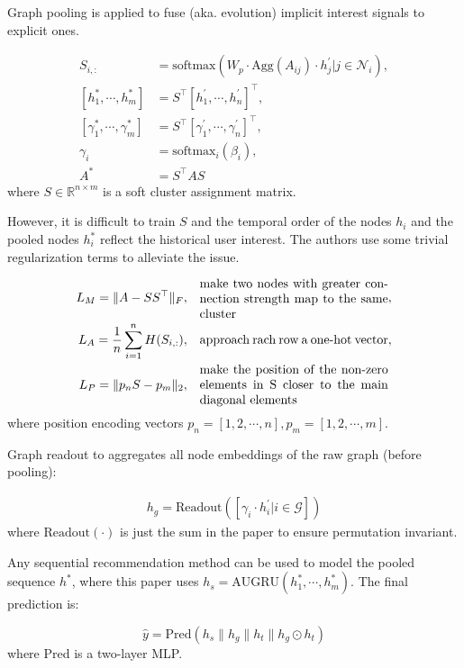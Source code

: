 Graph pooling is applied to fuse (aka. evolution) implicit interest signals to explicit ones.

\begin{align}
	S_{i,:} &= \text{softmax} (W_p \cdot \text{Agg} (A_{ij}) \cdot h_j^\prime | j \in \mathcal{N}_i), \\
	[h_1^*, \cdots, h_m^*] &= S^\top [h_1^\prime, \cdots, h_n^\prime]^\top, \\
	[\gamma_1^*, \cdots, \gamma_m^*] &= S^\top [\gamma_1^\prime, \cdots, \gamma_n^\prime]^\top, \\
	\gamma_i &= \text{softmax}_i (\beta_i), \\
	A^* &= S^\top A S
\end{align}
where $S \in \mathbb{R}^{n \times m}$ is a soft cluster assignment matrix.

However, it is difficult to train $S$ and the temporal order of the nodes $h_i$ and the pooled nodes $h_i^*$ reflect the historical user interest.
The authors use some trivial regularization terms to alleviate the issue.

\begin{align}
	L_M = \lVert A - SS^\top \rVert_F, \quad &\parbox{15em}{ make two nodes with greater connection strength map to the same cluster}, \\
	L_A = \frac{1}{n} \sum_{i=1}^n H(S_{i,:}), \quad &\parbox{15em}{ approach rach row a one-hot vector}, \\
	L_P = \lVert p_n S - p_m \rVert_2, \quad &\parbox{15em}{ make the position of the non-zero elements in S closer to the main diagonal elements}
\end{align}
where position encoding vectors $p_n = [1, 2, \cdots, n], p_m = [1, 2, \cdots, m]$.

Graph readout to aggregates all node embeddings of the raw graph (before pooling):

\begin{align}
	h_g = \text{Readout} ([\gamma_i \cdot h^\prime_i | i \in \mathcal{G}])
\end{align}
where $\text{Readout}(\cdot)$ is just the sum in the paper to ensure permutation invariant.

Any sequential recommendation method can be used to model the pooled sequence $h^*$, where this paper uses $h_s = \text{AUGRU}(h_1^*, \cdots, h_m^*)$.
The final prediction is:

\begin{equation}
	\hat{y} = \text{Pred} (h_s \parallel h_g \parallel h_t \parallel h_g \odot h_t)
\end{equation}
where Pred is a two-layer MLP.

